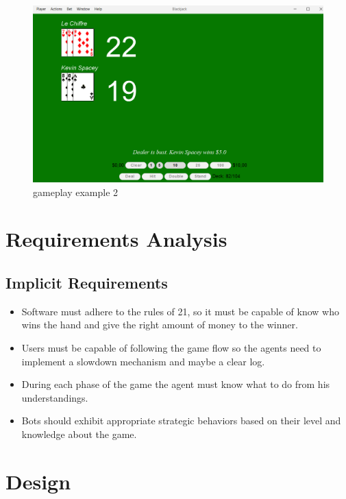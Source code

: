\begin{figure}[!htb]
    \centering
    \includegraphics[scale=0.55]{report/img/screen2.png}
    \caption{gameplay example 2}
    \label{fig:scren2}
\end{figure}

\chapter{Requirements Analysis}

\section{Implicit Requirements}
\begin{itemize}
   \item Software must adhere to the rules of 21, so it must be capable of know who wins the hand and give the right amount of money to the winner.
   \item Users must be capable of following the game flow so the agents need to implement a slowdown mechanism and maybe a clear log.
   \item During each phase of the game the agent must know what to do from his understandings.
   \item Bots should exhibit appropriate strategic behaviors based on their level and knowledge about the game.
\end{itemize}

\chapter{Design}

